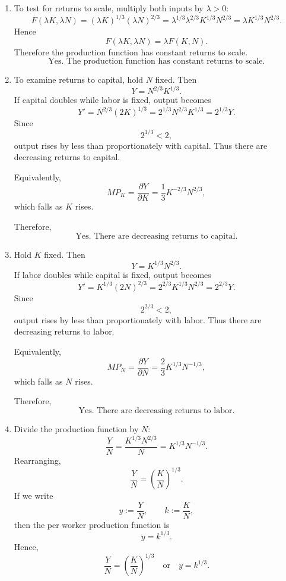 \documentclass[12pt]{article}
\begin{document}
\begin{enumerate}[label=(\alph*)]
    \item
    To test for returns to scale, multiply both inputs by \(\lambda>0\):
    \[
    F(\lambda K,\lambda N)
    =(\lambda K)^{1/3}(\lambda N)^{2/3}
    =\lambda^{1/3}\lambda^{2/3}K^{1/3}N^{2/3}
    =\lambda K^{1/3}N^{2/3}.
    \]
    Hence
    \[
    F(\lambda K,\lambda N)=\lambda F(K,N).
    \]
    Therefore the production function has constant returns to scale.
    \[
    \boxed{\text{Yes. The production function has constant returns to scale.}}
    \]

    \item
    To examine returns to capital, hold \(N\) fixed. Then
    \[
    Y=N^{2/3}K^{1/3}.
    \]
    If capital doubles while labor is fixed, output becomes
    \[
    Y' = N^{2/3}(2K)^{1/3}=2^{1/3}N^{2/3}K^{1/3}=2^{1/3}Y.
    \]
    Since
    \[
    2^{1/3}<2,
    \]
    output rises by less than proportionately with capital. Thus there are decreasing returns to capital.

    Equivalently,
    \[
    MP_K=\frac{\partial Y}{\partial K}
    =\frac{1}{3}K^{-2/3}N^{2/3},
    \]
    which falls as \(K\) rises.

    Therefore,
    \[
    \boxed{\text{Yes. There are decreasing returns to capital.}}
    \]

    \item
    Hold \(K\) fixed. Then
    \[
    Y=K^{1/3}N^{2/3}.
    \]
    If labor doubles while capital is fixed, output becomes
    \[
    Y'=K^{1/3}(2N)^{2/3}=2^{2/3}K^{1/3}N^{2/3}=2^{2/3}Y.
    \]
    Since
    \[
    2^{2/3}<2,
    \]
    output rises by less than proportionately with labor. Thus there are decreasing returns to labor.

    Equivalently,
    \[
    MP_N=\frac{\partial Y}{\partial N}
    =\frac{2}{3}K^{1/3}N^{-1/3},
    \]
    which falls as \(N\) rises.

    Therefore,
    \[
    \boxed{\text{Yes. There are decreasing returns to labor.}}
    \]

    \item
    Divide the production function by \(N\):
    \[
    \frac{Y}{N}
    =
    \frac{K^{1/3}N^{2/3}}{N}
    =
    K^{1/3}N^{-1/3}.
    \]
    Rearranging,
    \[
    \frac{Y}{N}=\left(\frac{K}{N}\right)^{1/3}.
    \]
    If we write
    \[
    y:=\frac{Y}{N},
    \qquad
    k:=\frac{K}{N},
    \]
    then the per worker production function is
    \[
    y=k^{1/3}.
    \]
    Hence,
    \[
    \boxed{\frac{Y}{N}=\left(\frac{K}{N}\right)^{1/3}\quad\text{or}\quad y=k^{1/3}.}
    \]
\end{enumerate}
\end{document}
